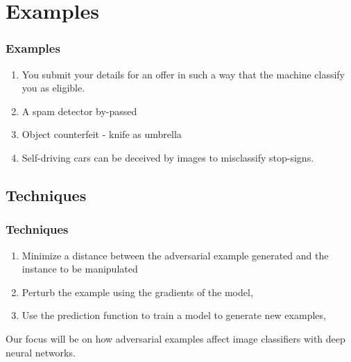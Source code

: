 \documentclass[12pt]{beamer}
\begin{document}
\section{Examples}
\begin{frame}
\frametitle{Examples}
\begin{enumerate}
	\item You submit your details for an offer in such a way that the machine classify you as eligible. \pause
	\item A spam detector by-passed \pause
	\item Object counterfeit - knife as umbrella \pause
	\item Self-driving cars can be deceived by images to misclassify stop-signs.
\end{enumerate}
\end{frame}

\subsection{Techniques}
\begin{frame}
\frametitle{Techniques}
\begin{enumerate}
	\item Minimize a distance between the adversarial example generated and the instance to be manipulated \pause
	\item Perturb the example using the gradients of the model, \pause
	\item Use the prediction function to train a model to generate new examples, \pause
\end{enumerate}
Our focus will be on how adversarial examples affect image classifiers with deep neural networks.
\end{frame}
\end{document}
